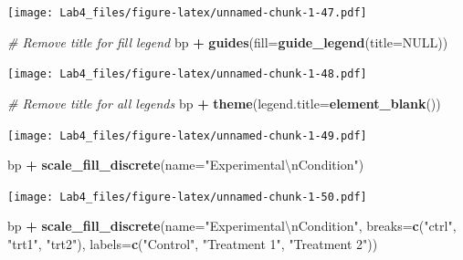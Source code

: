 \documentclass[]{article}
\newenvironment{Shaded}{\begin{snugshade}}{\end{snugshade}}
\newcommand{\KeywordTok}[1]{\textcolor[rgb]{0.13,0.29,0.53}{\textbf{#1}}}
\newcommand{\DataTypeTok}[1]{\textcolor[rgb]{0.13,0.29,0.53}{#1}}
\newcommand{\CharTok}[1]{\textcolor[rgb]{0.31,0.60,0.02}{#1}}
\newcommand{\StringTok}[1]{\textcolor[rgb]{0.31,0.60,0.02}{#1}}
\newcommand{\CommentTok}[1]{\textcolor[rgb]{0.56,0.35,0.01}{\textit{#1}}}
\newcommand{\OtherTok}[1]{\textcolor[rgb]{0.56,0.35,0.01}{#1}}
\newcommand{\OperatorTok}[1]{\textcolor[rgb]{0.81,0.36,0.00}{\textbf{#1}}}
\newcommand{\NormalTok}[1]{#1}
\begin{document}
\texttt{[image: Lab4\_files/figure-latex/unnamed-chunk-1-47.pdf]}

\begin{Shaded}
\begin{Highlighting}[]
\CommentTok{# Remove title for fill legend}
\NormalTok{bp }\OperatorTok{+}\StringTok{ }\KeywordTok{guides}\NormalTok{(}\DataTypeTok{fill=}\KeywordTok{guide_legend}\NormalTok{(}\DataTypeTok{title=}\OtherTok{NULL}\NormalTok{))}
\end{Highlighting}
\end{Shaded}

\texttt{[image: Lab4\_files/figure-latex/unnamed-chunk-1-48.pdf]}

\begin{Shaded}
\begin{Highlighting}[]
\CommentTok{# Remove title for all legends}
\NormalTok{bp }\OperatorTok{+}\StringTok{ }\KeywordTok{theme}\NormalTok{(}\DataTypeTok{legend.title=}\KeywordTok{element_blank}\NormalTok{())}
\end{Highlighting}
\end{Shaded}

\texttt{[image: Lab4\_files/figure-latex/unnamed-chunk-1-49.pdf]}

\begin{Shaded}
\begin{Highlighting}[]
\NormalTok{bp }\OperatorTok{+}\StringTok{ }\KeywordTok{scale_fill_discrete}\NormalTok{(}\DataTypeTok{name=}\StringTok{"Experimental}\CharTok{\textbackslash{}n}\StringTok{Condition"}\NormalTok{)}
\end{Highlighting}
\end{Shaded}

\texttt{[image: Lab4\_files/figure-latex/unnamed-chunk-1-50.pdf]}

\begin{Shaded}
\begin{Highlighting}[]
\NormalTok{bp }\OperatorTok{+}\StringTok{ }\KeywordTok{scale_fill_discrete}\NormalTok{(}\DataTypeTok{name=}\StringTok{"Experimental}\CharTok{\textbackslash{}n}\StringTok{Condition"}\NormalTok{,}
                         \DataTypeTok{breaks=}\KeywordTok{c}\NormalTok{(}\StringTok{"ctrl"}\NormalTok{, }\StringTok{"trt1"}\NormalTok{, }\StringTok{"trt2"}\NormalTok{),}
                         \DataTypeTok{labels=}\KeywordTok{c}\NormalTok{(}\StringTok{"Control"}\NormalTok{, }\StringTok{"Treatment 1"}\NormalTok{, }\StringTok{"Treatment 2"}\NormalTok{))}
\end{Highlighting}
\end{Shaded}
\end{document}
